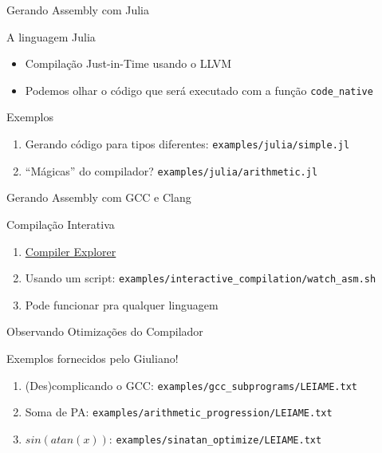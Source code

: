 \documentclass[10pt, compress, aspectratio=169, xcolor={table,usenames,dvipsnames}]{beamer}
\begin{document}
\begin{frame}[label={sec:org28e9ac1},fragile]{Gerando Assembly com Julia}
 \begin{block}{A linguagem Julia}
\begin{itemize}
\item Compilação \alert{Just-in-Time} usando o LLVM
\item Podemos olhar o código que será executado com a função \texttt{code\_native}
\end{itemize}
\end{block}
\begin{block}{Exemplos}
\begin{enumerate}
\item Gerando código para \alert{tipos diferentes}: \texttt{examples/julia/simple.jl}
\item \alert{``Mágicas''} do compilador? \texttt{examples/julia/arithmetic.jl}
\end{enumerate}
\end{block}
\end{frame}
\begin{frame}[label={sec:org76af1ed},fragile]{Gerando Assembly com GCC e Clang}
 \begin{block}{Compilação Interativa}
\begin{enumerate}
\item \href{https://godbolt.org/}{Compiler Explorer}
\item Usando um script: \texttt{examples/interactive\_compilation/watch\_asm.sh}
\item Pode funcionar pra qualquer linguagem
\end{enumerate}
\end{block}
\end{frame}
\begin{frame}[label={sec:orgf965b9a},fragile]{Observando Otimizações do Compilador}
 \begin{block}{Exemplos fornecidos pelo \alert{Giuliano}!}
\begin{enumerate}
\item (Des)complicando o GCC: \texttt{examples/gcc\_subprograms/LEIAME.txt}
\item Soma de PA: \texttt{examples/arithmetic\_progression/LEIAME.txt}
\item \(sin(atan(x))\): \texttt{examples/sinatan\_optimize/LEIAME.txt}
\end{enumerate}
\end{block}
\end{frame}
\end{document}
